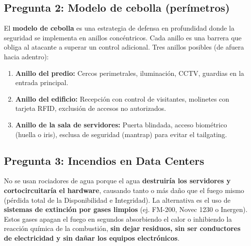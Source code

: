 \documentclass[11pt,a4paper]{article}
\begin{document}
\subsection*{Pregunta 2: Modelo de cebolla (perímetros)}
\begin{respuesta}
El \textbf{modelo de cebolla} es una estrategia de defensa en profundidad donde la seguridad se implementa en anillos concéntricos. Cada anillo es una barrera que obliga al atacante a superar un control adicional.
Tres anillos posibles (de afuera hacia adentro):
\begin{enumerate}[leftmargin=*]
  \item \textbf{Anillo del predio:} Cercos perimetrales, iluminación, CCTV, guardias en la entrada principal.
  \item \textbf{Anillo del edificio:} Recepción con control de visitantes, molinetes con tarjeta RFID, exclusión de accesos no autorizados.
  \item \textbf{Anillo de la sala de servidores:} Puerta blindada, acceso biométrico (huella o iris), esclusa de seguridad (mantrap) para evitar el tailgating.
\end{enumerate}
\end{respuesta}

\subsection*{Pregunta 3: Incendios en Data Centers}
\begin{respuesta}
No se usan rociadores de agua porque el agua \textbf{destruiría los servidores y cortocircuitaría el hardware}, causando tanto o más daño que el fuego mismo (pérdida total de la Disponibilidad e Integridad).
La alternativa es el uso de \textbf{sistemas de extinción por gases limpios} (ej. FM-200, Novec 1230 o Inergen). Estos gases apagan el fuego en segundos absorbiendo el calor o inhibiendo la reacción química de la combustión, \textbf{sin dejar residuos, sin ser conductores de electricidad y sin dañar los equipos electrónicos}.
\end{respuesta}
\end{document}
